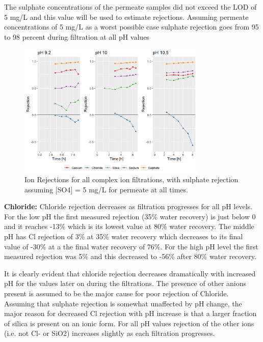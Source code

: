 The sulphate concentrations of the permeate samples did not exceed the LOD of 5 mg/L and this value will be used to estimate rejections.
Assuming permeate concentrations of 5 mg/L as a worst possible case sulphate rejection goes from 95 to 98 percent during filtration at all pH values


\begin{figure}[H]
    \centering
    \includegraphics[width=0.8\textwidth]{Billeder/data/multi_salt/multisalt_ion_rejections_with_sulphate_and_silica.png}
    \caption{Ion Rejections for all complex ion filtrations, with sulphate rejection assuming [SO4] = 5 mg/L for permeate at all times.}
    \label{fig:multi_salt_pH_ion_rejections_samlet_med_sulfat_og_silica}
\end{figure}





\textbf{Chloride:}
Chloride rejection decreases as filtration progresses for all pH levels.
For the low pH the first measured rejection (35\% water recovery) is just below 0 and it reaches -13\% which is its lowest value at 80\% water recovery.
The middle pH has Cl rejection of 3\% at 35\% water recovery which decreases to its final value of -30\% at a the final water recovery of 76\%.
For the high pH level the first measured rejection was 5\% and this decreased to -56\% after 80\% water recovery.

It is clearly evident that chloride rejection decreases dramatically with increased pH for the values later on during the filtrations. 
The presence of other anions present is assumed to be the major cause for poor rejection of Chloride.
Assuming that sulphate rejection is somewhat unaffected by pH change, the major reason for decreased Cl rejection with pH increase is that a larger fraction of silica is present on an ionic form.
For all pH values rejection of the other ions (i.e. not Cl- or SiO2) increases slightly as each filtration progresses.


